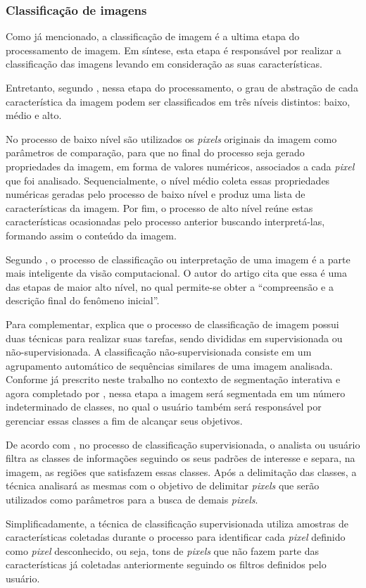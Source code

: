\subsubsection{{Classificação de imagens}}

Como já mencionado, a classificação de imagem é a ultima etapa do processamento de imagem. Em síntese, esta etapa é responsável por realizar a classificação das imagens levando em consideração as suas características.

Entretanto, segundo , nessa etapa do processamento, o grau de abstração de cada característica da imagem podem ser classificados em três níveis distintos: baixo, médio e alto.

No processo de baixo nível são utilizados os \textit{pixels} originais da imagem como parâmetros de comparação, para que no final do processo seja gerado propriedades da imagem, em forma de valores numéricos, associados a cada \textit{pixel} que foi analisado. Sequencialmente, o nível médio coleta essas propriedades numéricas geradas pelo processo de baixo nível e produz uma lista de características da imagem. Por fim, o processo de alto nível reúne estas características ocasionadas pelo processo anterior buscando interpretá-las, formando assim o conteúdo da imagem.

Segundo , o processo de classificação ou interpretação de uma imagem é a parte mais inteligente da visão computacional. O autor do artigo cita que essa é uma das etapas de maior alto nível, no qual permite-se obter a “compreensão e a descrição final do fenômeno inicial”.

Para complementar,  explica que o processo de classificação de imagem possui duas técnicas para realizar suas tarefas, sendo divididas em supervisionada ou não-supervisionada. A classificação não-supervisionada consiste em um agrupamento automático de sequências similares de uma imagem analisada. Conforme já prescrito neste trabalho no contexto de segmentação interativa e agora completado por , nessa etapa a imagem será segmentada em um número indeterminado de classes, no qual o usuário também será responsável por gerenciar essas classes a fim de alcançar seus objetivos.

De acordo com , no processo de classificação supervisionada, o analista ou usuário filtra as classes de informações seguindo os seus padrões de interesse e separa, na imagem, as regiões que satisfazem essas classes. Após a delimitação das classes, a técnica analisará as mesmas com o objetivo de delimitar \textit{pixels} que serão utilizados como parâmetros para a busca de demais \textit{pixels}.

Simplificadamente, a técnica de classificação supervisionada utiliza amostras de características coletadas durante o processo para identificar cada \textit{pixel} definido como \textit{pixel} desconhecido, ou seja, tons de \textit{pixels} que não fazem parte das características já coletadas anteriormente seguindo os filtros definidos pelo usuário.